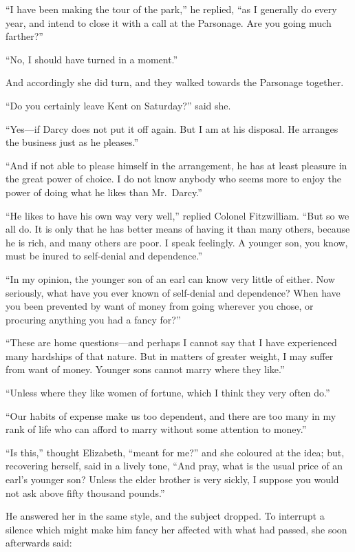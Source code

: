 ``I have been making the tour of the park,'' he replied, ``as I
generally do every year, and intend to close it with a call at the
Parsonage.  Are you going much farther?''

``No, I should have turned in a moment.''

And accordingly she did turn, and they walked towards the
Parsonage together.

``Do you certainly leave Kent on Saturday?'' said she.

``Yes---if Darcy does not put it off again.  But I am at his
disposal.  He arranges the business just as he pleases.''

``And if not able to please himself in the arrangement, he has
at least pleasure in the great power of choice.  I do not know
anybody who seems more to enjoy the power of doing what he
likes than Mr.\ Darcy.''

``He likes to have his own way very well,'' replied Colonel
Fitzwilliam.  ``But so we all do.  It is only that he has better
means of having it than many others, because he is rich, and
many others are poor.  I speak feelingly.  A younger son, you
know, must be inured to self-denial and dependence.''

``In my opinion, the younger son of an earl can know very
little of either.  Now seriously, what have you ever known of
self-denial and dependence?  When have you been prevented by
want of money from going wherever you chose, or procuring
anything you had a fancy for?''

``These are home questions---and perhaps I cannot say that I
have experienced many hardships of that nature.  But in matters
of greater weight, I may suffer from want of money.  Younger
sons cannot marry where they like.''

``Unless where they like women of fortune, which I think they
very often do.''

``Our habits of expense make us too dependent, and there are too
many in my rank of life who can afford to marry without some
attention to money.''

``Is this,'' thought Elizabeth, ``meant for me?'' and she coloured
at the idea; but, recovering herself, said in a lively tone, ``And
pray, what is the usual price of an earl's younger son?  Unless
the elder brother is very sickly, I suppose you would not ask
above fifty thousand pounds.''

He answered her in the same style, and the subject dropped.  To
interrupt a silence which might make him fancy her affected with
what had passed, she soon afterwards said:

